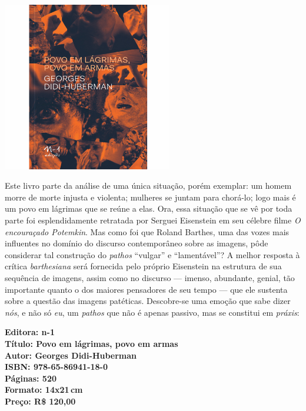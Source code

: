 \begin{center}
\hspace*{.5cm}\includegraphics[width=74mm]{./CAPAS/N-1_POVO.jpg}
\end{center}

\hspace*{-7cm}\hrulefill\hspace*{-7cm}

\medskip

\noindent{}Este livro parte da análise de uma única situação, porém exemplar: um homem morre de morte injusta e violenta; mulheres se juntam para chorá-lo; logo mais é um povo em lágrimas que se reúne a elas. Ora, essa situação que se vê por toda parte foi esplendidamente retratada por Serguei Eisenstein em seu célebre filme \textit{O encouraçado Potemkin}. Mas como foi que Roland Barthes, uma das vozes mais influentes no domínio do discurso contemporâneo sobre as imagens, pôde considerar tal construção do \textit{pathos} ``vulgar'' e ``lamentável''?
A melhor resposta à crítica \textit{barthesiana} será fornecida pelo próprio Eisenstein na estrutura de sua sequência de imagens, assim como no discurso --- imenso, abundante, genial, tão importante quanto o dos maiores pensadores de seu tempo --- que ele sustenta sobre a questão das imagens patéticas. Descobre-se uma emoção que sabe dizer \textit{nós}, e não só \textit{eu}, um \textit{pathos} que não é apenas passivo, mas se constitui em \textit{práxis}: 

\vfill

\hspace*{-.4cm}\begin{minipage}[c]{.5\linewidth}
\small\textbf{
\hspace*{-.1cm}Editora: n-1\\
Título: Povo em lágrimas, povo em armas\\
Autor: Georges Didi-Huberman\\ 
ISBN: 978-65-86941-18-0\\
Páginas: 520\\
Formato: 14x21\,cm\\
Preço: R\$ 120,00\\
}
\end{minipage}

